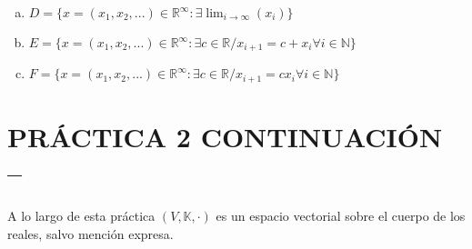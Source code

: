 \documentclass{article}
\begin{document}
\begin{enumerate}[a.]
\item
	$D = \lbrace x =(x_1,x_2,...) \in \mathbb{R}^\infty : \exists \displaystyle \lim_{i \to \infty}(x_i) \rbrace$
\item
	$E = \lbrace x = (x_1,x_2,...) \in \mathbb{R}^\infty : \exists c \in \mathbb{R} / x_{i+1} = c + x_i \forall i \in \mathbb{N}\rbrace$
\item
	$F = \lbrace x = (x_1,x_2,...) \in \mathbb{R}^\infty : \exists c \in \mathbb{R} / x_{i+1} = cx_i \forall i \in \mathbb{N}\rbrace$
\end{enumerate}

\section{PRÁCTICA 2 CONTINUACIÓN -- }
A lo largo de esta práctica $(V, \mathbb{K},\cdot)$ es un espacio vectorial sobre el cuerpo de los reales, salvo mención expresa. \\
\end{document}

